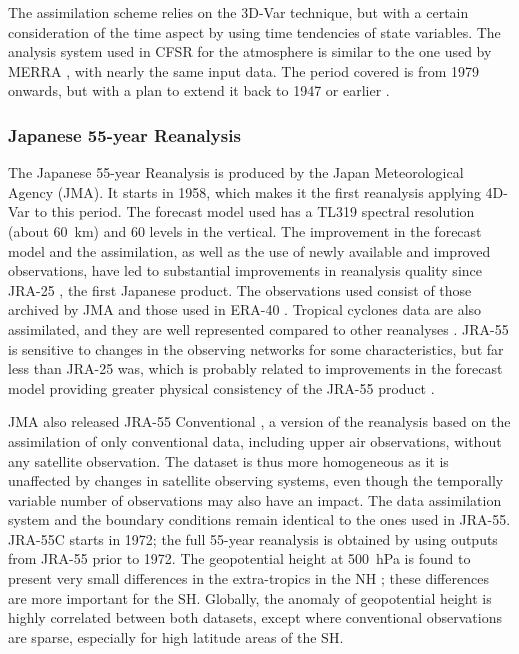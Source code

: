 \documentclass[smallextended]{svjour3}       %
\begin{document}
	The assimilation scheme relies on the 3D-Var technique, but with a certain consideration of the time aspect by using time tendencies of state variables. The analysis system used in CFSR for the atmosphere is similar to the one used by MERRA \citep{Rienecker2011}, with nearly the same input data. The period covered is from 1979 onwards, but with a plan to extend it back to 1947 or earlier \citep{Saha2010a}.
	
	
	\subsubsection{Japanese 55-year Reanalysis}
	
	The Japanese 55-year Reanalysis \citep[JRA-55 --][]{Kobayashi2015, Harada2016} is produced by the Japan Meteorological Agency (JMA). It starts in 1958, which makes it the first reanalysis applying 4D-Var to this period. The forecast model used has a TL319 spectral resolution (about 60~km) and 60 levels in the vertical. The improvement in the forecast model and the assimilation, as well as the use of newly available and improved observations, have led to substantial improvements in reanalysis quality since JRA-25 \citep{Onogi2007}, the first Japanese product. The observations used consist of those archived by JMA and those used in ERA-40 \citep{Uppala2005}. Tropical cyclones data are also assimilated, and they are well represented compared to other reanalyses \citep{Harada2016}. JRA-55 is sensitive to changes in the observing networks for some characteristics, but far less than JRA-25 was, which is probably related to improvements in the forecast model providing greater physical consistency of the JRA-55 product \citep{Kobayashi2015}.
	
	JMA also released JRA-55 Conventional \citep[JRA-55C --][]{Kobayashi2014}, a version of the reanalysis based on the assimilation of only conventional data, including upper air observations, without any satellite observation. The dataset is thus more homogeneous as it is unaffected by changes in satellite observing systems, even though the temporally variable number of observations may also have an impact. The data assimilation system and the boundary conditions remain identical to the ones used in JRA-55. JRA-55C starts in 1972; the full 55-year reanalysis is obtained by using outputs from JRA-55 prior to 1972. The geopotential height at 500~hPa is found to present very small differences in the extra-tropics in the NH \citep{Kobayashi2014}; these differences are more important for the SH. Globally, the anomaly of geopotential height is highly correlated between both datasets, except where conventional observations are sparse, especially for high latitude areas of the SH.
	
\end{document}
